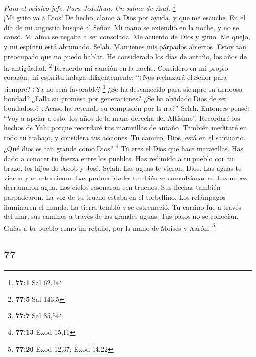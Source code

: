 \begin{paracol}{2}
\emph{Para el músico jefe. Para Jeduthun. Un salmo de Asaf.}
\footnote{\textbf{77:1} Sal 62,1}\\
 ¡Mi grito va a Dios! De hecho, clamo a Dios por ayuda, y
que me escuche.  En el día de mi angustia busqué al Señor.
Mi mano se extendió en la noche, y no se cansó. Mi alma se negaba a ser
consolada.  Me acuerdo de Dios y gimo. Me quejo, y mi
espíritu está abrumado. Selah.  Mantienes mis párpados
abiertos. Estoy tan preocupado que no puedo hablar.  He
considerado los días de antaño, los años de la antigüedad. \footnote{\textbf{77:5}
  Sal 143,5}  Recuerdo mi canción en la noche. Considero
en mi propio corazón; mi espíritu indaga diligentemente: 
``¿Nos rechazará el Señor para siempre? ¿Ya no será favorable?
\footnote{\textbf{77:7} Sal 85,5}  ¿Se ha desvanecido para
siempre su amorosa bondad? ¿Falla su promesa por generaciones?
 ¿Se ha olvidado Dios de ser bondadoso? ¿Acaso ha retenido
su compasión por la ira?'' Selah.  Entonces pensé: ``Voy
a apelar a esto: los años de la mano derecha del Altísimo''.
 Recordaré los hechos de Yah; porque recordaré tus
maravillas de antaño.  También meditaré en todo tu
trabajo, y considera tus acciones.  Tu camino, Dios, está
en el santuario. ¿Qué dios es tan grande como Dios? \footnote{\textbf{77:13}
  Éxod 15,11}  Tú eres el Dios que hace maravillas. Has
dado a conocer tu fuerza entre los pueblos.  Has redimido
a tu pueblo con tu brazo, los hijos de Jacob y José. Selah.
 Las aguas te vieron, Dios. Las aguas te vieron y se
retorcieron. Las profundidades también se convulsionaron.
 Las nubes derramaron agua. Los cielos resonaron con
truenos. Sus flechas también parpadearon.  La voz de tu
trueno estaba en el torbellino. Los relámpagos iluminaron el mundo. La
tierra tembló y se estremeció.  Tu camino fue a través
del mar, sus caminos a través de las grandes aguas. Tus pasos no se
conocían.  Guías a tu pueblo como un rebaño, por la mano
de Moisés y Aarón. \footnote{\textbf{77:20} Éxod 12,37; Éxod 14,22}

\switchcolumn
\begin{otherlanguage}{english}

\hypertarget{section-153}{%
\section{77}\label{section-153}}


\end{otherlanguage}
\end{paracol}
